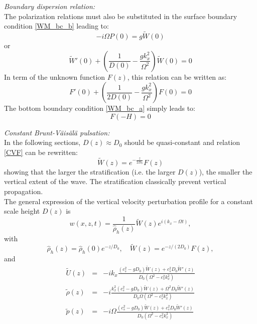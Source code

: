 \documentclass[a4paper,11pt]{article}
\begin{document}
\textit{Boundary dispersion relation:}\\
The polarization relations must also be substituted in the surface boundary condition \ref{WM_bc_b} leading to:
\begin{equation}
  \displaystyle
  -i\Omega P(0)=g \widetilde{W}(0)
\end{equation}
or
\begin{equation}
  \displaystyle
  \widetilde{W}'(0)+\left(
  \frac{1}{D(0)}-\frac{gk_x^2}{\Omega^2}
  \right)\widetilde{W}(0)=0
\end{equation}
In term of the unknown function $F(z)$, this relation can be written as:
\begin{equation}
  \displaystyle
  F'(0)+\left(
  \frac{1}{2D(0)}-\frac{gk_x^2}{\Omega^2}
  \right)F(0)=0
  \label{eqFbc}
\end{equation}
The bottom boundary condition \ref{WM_bc_a} simply leads to:
\begin{equation}
  \displaystyle
  F(-H)=0
  \label{eqFbc2}
\end{equation}

\textit{Constant Brunt-Väisälä pulsation:}\\
In the following sections, $D(z)\approx D_0$ should be quasi-constant and relation \ref{CVF} can be rewritten:
\begin{equation}
  \displaystyle
  \widetilde{W}(z)=e^{-\frac{z}{2D_0}}F(z)
  \label{CVF2}
\end{equation}
showing that the larger the stratification (i.e. the larger $D(z)$), the smaller the vertical extent of the wave. The stratification classically prevent vertical propagation.\\
The general expression of the vertical velocity perturbation profile for a constant scale height $D(z)$ is
\begin{equation}
  \displaystyle
  w(x,z,t)=\frac{1}{\hat{\rho}_h(z)}\widetilde{W}(z)e^{i(k_x-\Omega t)},
\end{equation}
with 
\begin{equation}
  \displaystyle
  \hat{\rho}_h(z)=\hat{\rho}_h(0)e^{-z/D_0},\quad \widetilde{W}(z)=e^{-z/(2D_0)}F(z),
\end{equation}
and
\begin{equation}
  \displaystyle
  \begin{array}{rcl}
    \widetilde{U}(z)&=&\displaystyle  -ik_x\frac{(c_s^2-gD_0)\widetilde{W}(z)+c_s^2D_0\widetilde{W}'(z)}{D_0(\Omega^2-c_s^2k_x^2)}\\[4mm]
    \widetilde{\rho}(z)&=&\displaystyle -i\frac{k_x^2(c_s^2-gD_0)\widetilde{W}(z)+\Omega^2D_0\widetilde{W}'(z)}{D_0\Omega(\Omega^2-c_s^2k_x^2)}\\[4mm]
    \widetilde{p}(z)&=&\displaystyle -i\Omega\frac{(c_s^2-gD_0)\widetilde{W}(z)+c_s^2D_0\widetilde{W}'(z)}{D_0(\Omega^2-c_s^2k_x^2)}
\end{array}
\end{equation}
\end{document}
